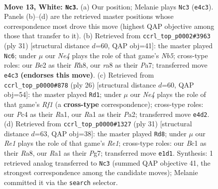 \documentclass[11pt]{article}
\begin{document}
\clearpage

\begin{figure}[p]\centering
\begin{subfigure}{0.46\textwidth}\centering
\resizebox{\linewidth}{!}{%
\newchessgame
\chessboard[
  setfen={rnbr2k1/ppp5/6p1/4bp1p/2P1N3/8/PP2BPPP/R1B1R1K1 w - - 0 13},
  showmover=false,
  pgfstyle=straightmove, color=movearrow, markmove={e4-c3}
]}
\caption{}
\end{subfigure}\hfill
\begin{subfigure}{0.46\textwidth}\centering
\resizebox{\linewidth}{!}{%
\newchessgame
\chessboard[
  setfen={2r1k2r/p3bppp/b3p3/N1p5/1n6/P5P1/1P1BPP1P/R2K1B1R b k - 0 16},
  showmover=false,
  pgfstyle=straightmove, color=movearrow, markmove={b4-c6}
]}
\caption{}
\end{subfigure}
\\[4pt]
\begin{subfigure}{0.46\textwidth}\centering
\resizebox{\linewidth}{!}{%
\newchessgame
\chessboard[
  setfen={r3k2r/pp2pp1p/6p1/8/3bB3/6Pb/PP2PP1P/R1B2RK1 w kq - 2 14},
  showmover=false,
  pgfstyle=straightmove, color=movearrow, markmove={f1-d1}
]}
\caption{}
\end{subfigure}\hfill
\begin{subfigure}{0.46\textwidth}\centering
\resizebox{\linewidth}{!}{%
\newchessgame
\chessboard[
  setfen={r1b1r1k1/pp3pp1/2n4p/2n5/2BN4/P3P2P/5PP1/R1BR2K1 b - - 1 16},
  showmover=false,
  pgfstyle=straightmove, color=movearrow, markmove={e8-d8}
]}
\caption{}
\end{subfigure}
\caption{\textbf{Move 13, White: \texttt{Nc3}.} (a) Our position; Melanie plays \texttt{Nc3} (\texttt{e4c3}). Panels (b)--(d) are the retrieved master positions whose correspondence most drove this move (highest QAP objective among those that transfer to it). (b) Retrieved from \texttt{ccrl\_top\_p0002\#3963} (ply 31) [structural distance $d$=60, QAP obj=41]: the master played \texttt{Nc6}; under $\mu$ our \emph{Ne4} plays the role of that game's \emph{Nb5}; cross-type roles: our \emph{B}e2 as their \emph{R}h8, our \emph{r}a8 as their \emph{P}a7; transferred move \texttt{e4c3} \textbf{(endorses this move)}. (c) Retrieved from \texttt{ccrl\_top\_p0000\#878} (ply 26) [structural distance $d$=60, QAP obj=54]: the master played \texttt{Rd1}; under $\mu$ our \emph{Ne4} plays the role of that game's \emph{Rf1} (a \textbf{cross-type} correspondence); cross-type roles: our \emph{P}c4 as their \emph{R}a1, our \emph{R}a1 as their \emph{P}a2; transferred move \texttt{e4d2}. (d) Retrieved from \texttt{ccrl\_top\_p0000\#1327} (ply 31) [structural distance $d$=63, QAP obj=38]: the master played \texttt{Rd8}; under $\mu$ our \emph{Re1} plays the role of that game's \emph{Re1}; cross-type roles: our \emph{B}c1 as their \emph{R}a8, our \emph{R}a1 as their \emph{P}g7; transferred move \texttt{e1d1}. Synthesis: 1 retrieved analog transferred to \texttt{Nc3} (summed QAP objective 41, the strongest correspondence among the candidate moves); Melanie committed it via the \texttt{search} selector.}
\label{fig:thought-m24}
\end{figure}
\end{document}
